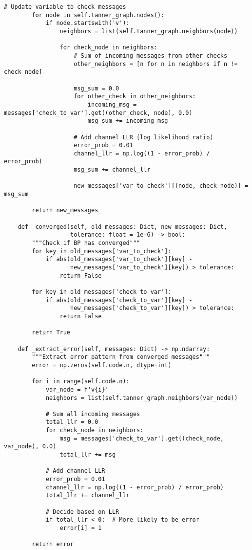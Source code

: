 \documentclass[12pt,a4paper]{article}
\begin{document}
\begin{lstlisting}[style=python,caption=Belief propagation exploiting modular structure]
        # Update variable to check messages
        for node in self.tanner_graph.nodes():
            if node.startswith('v'):
                neighbors = list(self.tanner_graph.neighbors(node))
                
                for check_node in neighbors:
                    # Sum of incoming messages from other checks
                    other_neighbors = [n for n in neighbors if n != check_node]
                    
                    msg_sum = 0.0
                    for other_check in other_neighbors:
                        incoming_msg = messages['check_to_var'].get((other_check, node), 0.0)
                        msg_sum += incoming_msg
                    
                    # Add channel LLR (log likelihood ratio)
                    error_prob = 0.01
                    channel_llr = np.log((1 - error_prob) / error_prob)
                    msg_sum += channel_llr
                    
                    new_messages['var_to_check'][(node, check_node)] = msg_sum
        
        return new_messages
    
    def _converged(self, old_messages: Dict, new_messages: Dict, 
                   tolerance: float = 1e-6) -> bool:
        """Check if BP has converged"""
        for key in old_messages['var_to_check']:
            if abs(old_messages['var_to_check'][key] - 
                   new_messages['var_to_check'][key]) > tolerance:
                return False
        
        for key in old_messages['check_to_var']:
            if abs(old_messages['check_to_var'][key] - 
                   new_messages['check_to_var'][key]) > tolerance:
                return False
        
        return True
    
    def _extract_error(self, messages: Dict) -> np.ndarray:
        """Extract error pattern from converged messages"""
        error = np.zeros(self.code.n, dtype=int)
        
        for i in range(self.code.n):
            var_node = f'v{i}'
            neighbors = list(self.tanner_graph.neighbors(var_node))
            
            # Sum all incoming messages
            total_llr = 0.0
            for check_node in neighbors:
                msg = messages['check_to_var'].get((check_node, var_node), 0.0)
                total_llr += msg
            
            # Add channel LLR
            error_prob = 0.01
            channel_llr = np.log((1 - error_prob) / error_prob)
            total_llr += channel_llr
            
            # Decide based on LLR
            if total_llr < 0:  # More likely to be error
                error[i] = 1
        
        return error
\end{lstlisting}
\end{document}
